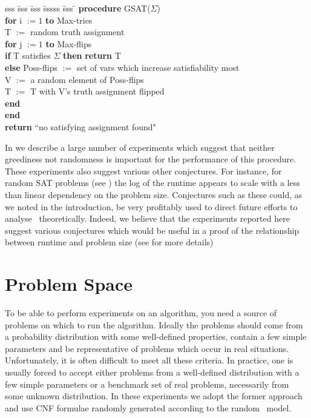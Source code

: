 {\samepage
\begin{tabbing}
sss \= sss \= sss \= sssss \= sss \= \kill
{\bf procedure} GSAT($\Sigma$) \\
\> {\bf for} i $:=1$ {\bf to} Max-tries \\
\> \> T $:=$ random truth assignment \\
\> \> {\bf for} j $:=1$ {\bf to} Max-flips \\
\> \> \> {\bf if} T satisfies $\Sigma$ {\bf then} {\bf return} T \\
\> \> \> {\bf else} \> Poss-flips $:=$ set of vars which increase  satisfiability most \\
\> \> \> \> V $:=$ a random element of Poss-flips \\
\> \> \> \> T $:=$ T with V's truth assignment flipped \\
\> \> {\bf end} \\
\> {\bf end} \\
\> {\bf return} ``no satisfying assignment found"
\end{tabbing}}
\pagebreak


In \cite{gensat} we describe a large number of 
experiments which suggest that neither greediness
not randomness is important for the performance
of this procedure. These experiments also suggest
various other conjectures. For instance, for random
\3SAT problems (see )
the log of the runtime appears to scale with a less
than linear dependency on the problem size.
Conjectures such as these could, as we noted in the introduction,
be very profitably used to direct future efforts to 
analyse \GSAT\ theoretically. Indeed, we believe that
the experiments reported here suggest various conjectures
which would be useful in a proof of the relationship
between runtime and problem size 
(see  for more details) 


\section{Problem Space}
\label{sec-problems}

To be able to perform experiments on an algorithm,
you need a source of problems on which to run
the algorithm. Ideally the 
problems should come from a probability distribution with some
well-defined properties, contain a few simple parameters 
and be representative of problems which
occur in real situations. Unfortunately,
it is often difficult to meet all these criteria. In
practice, one is usually forced to accept either problems from
a well-defined distribution with a few simple parameters
or a benchmark set of real problems, necessarily from some unknown
distribution. In these experiments we adopt the former
approach and use CNF formulae randomly generated according 
to the random \kSAT\ model. 

